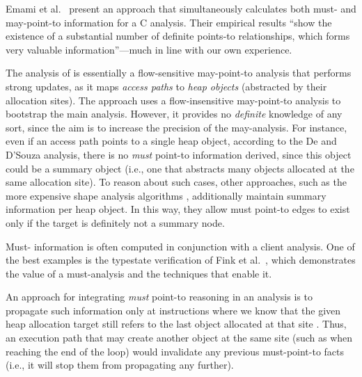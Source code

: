 Emami et al.~\cite{pldi:1994:Emami} present an approach that simultaneously calculates both must- and may-point-to information for a C analysis. Their empirical results ``show the existence of a substantial number of definite points-to relationships, which forms very valuable information''---much in line with our own experience.

The analysis of \cite{ecoop:2012:De} is essentially a flow-sensitive may-point-to analysis that performs strong updates, as it maps \emph{access paths} to \emph{heap objects} (abstracted by their allocation sites). The approach uses a flow-insensitive may-point-to analysis to bootstrap the main analysis. However, it provides no \emph{definite} knowledge of any sort, since the aim is to increase the precision of the may-analysis. For instance, even if an access path points to a single heap object, according to the De and D'Souza analysis, there is no \emph{must} point-to information derived, since this object could be a summary object (i.e., one that abstracts many objects allocated at the same allocation site). To reason about such cases, other approaches, such as the more expensive shape analysis algorithms \cite{article:2002:Sagiv}, additionally maintain summary information per heap object. In this way, they allow must point-to edges to exist only if the target is definitely not a summary node.

Must- information is often computed in conjunction with a client analysis. One of the best examples is the typestate verification of Fink et al.~\cite{issta:2006:Fink}, which demonstrates the value of a must-analysis and the techniques that enable it.

An approach for integrating \emph{must} point-to reasoning in an analysis is to propagate such information only at instructions where we know that the given heap allocation target still refers to the last object allocated at that site \cite{popl:1995:Altucher}. Thus, an execution path that may create another object at the same site (such as when reaching the end of the loop) would invalidate any previous must-point-to facts (i.e., it will stop them from propagating any further).

